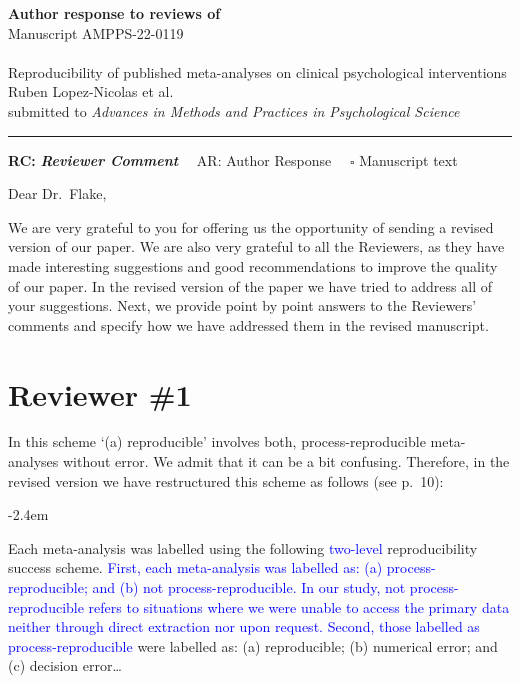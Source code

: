 \documentclass[draft]{article}
\renewenvironment{quote}{\begin{fquote}\advance\leftmargini -2.4em\begin{oldquote}}{\end{oldquote}\end{fquote}}
\newenvironment{fquote}
  {\def\FrameCommand{
	\fboxsep=0.6em %
	\fcolorbox{black}{white}}%
    \MakeFramed {\advance\hsize-2\width \FrameRestore}
    \begin{minipage}{\linewidth}
  }
  {\end{minipage}\endMakeFramed}
\begin{document}
{\Large\bf Author response to reviews of}\\[1em]
Manuscript AMPPS-22-0119\\ \\
{\Large Reproducibility of published meta-analyses on clinical psychological interventions}\\[1em]
{Ruben Lopez-Nicolas et al.}\\
{submitted to \it Advances in Methods and Practices in Psychological Science }\\
\hrule

\hfill {\bfseries RC:} \textbf{\textit{Reviewer Comment}}\(\quad\) AR: Author Response \(\quad\square\) Manuscript text

\vspace{2em}

Dear Dr.~Flake,

We are very grateful to you for offering us the opportunity of sending a revised version of our paper. We are also very grateful to all the Reviewers, as they have made interesting suggestions and good recommendations to improve the quality of our paper.
In the revised version of the paper we have tried to address all of your suggestions. Next, we provide point by point answers to the Reviewers' comments and specify how we have addressed them in the revised manuscript.

\hypertarget{reviewer-1}{%
\section{Reviewer \#1}\label{reviewer-1}}


In this scheme `(a) reproducible' involves both, process-reproducible meta-analyses without error. We admit that it can be a bit confusing. Therefore, in the revised version we have restructured this scheme as follows (see p.~10):

\begin{quote}
Each meta-analysis was labelled using the following \textcolor{blue}{two-level} reproducibility success scheme. \textcolor{blue}{First, each meta-analysis was labelled as: (a) process-reproducible; and (b) not process-reproducible. In our study, not process-reproducible refers to situations where we were unable to access the primary data neither through direct extraction nor upon request. Second, those labelled as process-reproducible} were labelled as: (a) reproducible; (b) numerical error; and (c) decision error\ldots{}
\end{quote}
\end{document}
